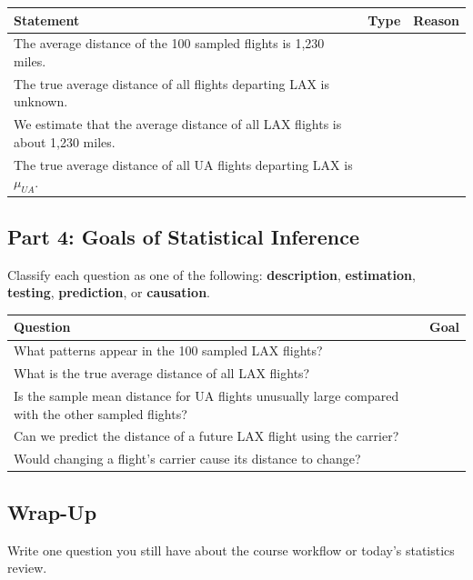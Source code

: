 \documentclass{article}
\begin{document}
\begin{center}
\renewcommand{\arraystretch}{1.5}
\begin{tabularx}{\textwidth}{p{8.1cm}p{2.6cm}X}
\toprule
\textbf{Statement} & \textbf{Type} & \textbf{Reason} \\
\midrule
The average distance of the 100 sampled flights is 1,230 miles. & & \\[2.2em]
The true average distance of all flights departing LAX is unknown. & & \\[2.2em]
We estimate that the average distance of all LAX flights is about 1,230 miles. & & \\[2.2em]
The true average distance of all UA flights departing LAX is $\mu_{UA}$. & & \\
\bottomrule
\end{tabularx}
\end{center}

\subsection*{Part 4: Goals of Statistical Inference}
Classify each question as one of the following: \textbf{description}, \textbf{estimation}, \textbf{testing}, \textbf{prediction}, or \textbf{causation}.

\begin{center}
\renewcommand{\arraystretch}{1.45}
\begin{tabularx}{\textwidth}{p{9cm}X}
\toprule
\textbf{Question} & \textbf{Goal} \\
\midrule
What patterns appear in the 100 sampled LAX flights? & \\[1.8em]
What is the true average distance of all LAX flights? & \\[1.8em]
Is the sample mean distance for UA flights unusually large compared with the other sampled flights? & \\[1.8em]
Can we predict the distance of a future LAX flight using the carrier? & \\[1.8em]
Would changing a flight's carrier cause its distance to change? & \\
\bottomrule
\end{tabularx}
\end{center}

\subsection*{Wrap-Up}
Write one question you still have about the course workflow or today's statistics review. 
\end{document}
